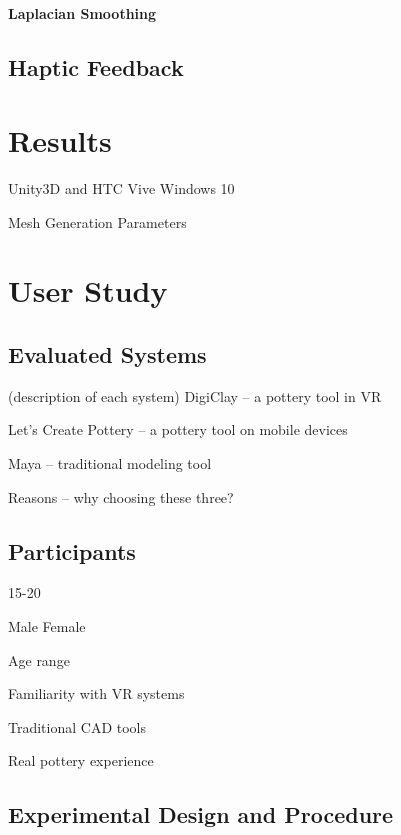 \paragraph{Laplacian Smoothing}


\subsection{Haptic Feedback}
\label{sec:2}







\section{Results}
\label{sec:1}

Unity3D and HTC Vive
Windows 10

Mesh Generation Parameters




\section{User Study}
\label{sec:1}

\subsection{Evaluated Systems}
\label{sec:2}

(description of each system)
DigiClay – a pottery tool in VR

Let’s Create Pottery – a pottery tool on mobile devices

Maya – traditional modeling tool

Reasons – why choosing these three?



\subsection{Participants}
\label{sec:2}

15-20

Male Female

Age range

Familiarity with VR systems

Traditional CAD tools 

Real pottery experience



\subsection{Experimental Design and Procedure}
\label{sec:2}


